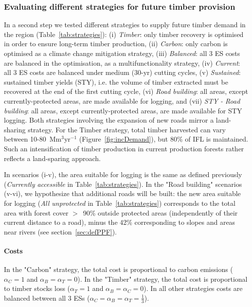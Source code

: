 \documentclass{article}
\begin{document}
\subsubsection{Evaluating different strategies for future timber provision}
\label{sec:strategies}

In a second step we tested different strategies to supply future timber demand in the region (Table~\ref{tab:strategies}): (i) \textit{Timber}: only timber recovery is optimised in order to ensure long-term timber production, (ii) \textit{Carbon}: only carbon is optimised as a climate change mitigation strategy, (iii) \textit{Balanced}: all 3 ES costs are balanced in the optimisation, as a multifunctionality strategy, (iv) \textit{Current}: all 3 ES costs are balanced under medium (30-yr) cutting cycles, (v) \textit{Sustained}: sustained timber yields (STY), i.e. the volume of timber extracted must be recovered at the end of the first cutting cycle, (vi) \textit{Road building}: all areas, except currently-protected areas, are made available for logging, and (vii) \textit{STY - Road building}: all areas, except currently-protected areas, are made available for STY logging. Both strategies involving the expansion of new roads mirror a land-sharing strategy. For the Timber strategy, total timber harvested can vary between 10-80~Mm$^3$yr$^{-1}$ (Figure~\ref{fig:incDemand}), but 80\% of IFL is maintained. Such an intensification of timber production in current production forests rather reflects a land-sparing approach.

In scenarios (i-v), the area suitable for logging is the same as defined previously (\textit{Currently accessible} in Table~\ref{tab:strategies}). In the "Road building" scenarios (v-vi), we hypothesize that additional roads will be built: the new area suitable for logging (\textit{All unprotected} in Table~\ref{tab:strategies}) corresponds to the total area with forest cover $>$~90\% outside protected areas (independently of their current distance to a road), minus the 42\% corresponding to slopes and areas near rivers (see section~\ref{sec:defPPF}). 

\paragraph{Costs}

In the "Carbon" strategy, the total cost is proportional to carbon emissions ($\alpha_C=1$ and $\alpha_B=\alpha_T=0$). In the "Timber" strategy, the total cost is proportional to timber stocks loss ($\alpha_T=1$ and $\alpha_B=\alpha_C=0$). In all other strategies costs are balanced between all 3 ESs ($\alpha_C=\alpha_B=\alpha_T=\frac{1}{3}$).
\end{document}
